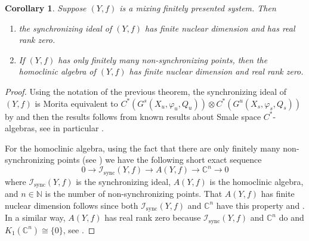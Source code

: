 \documentclass{amsart}
\newcommand{\C}{\mathbb{C}}
\newcommand{\N}{\mathbb{N}}
\theoremstyle{plain}
\newtheorem{corollary}[theorem]{Corollary}
\theoremstyle{definition}
\theoremstyle{remark}
\begin{document}
\begin{corollary}
Suppose $(Y, f)$ is a mixing finitely presented system. Then 
\begin{enumerate}
\item the synchronizing ideal of $(Y, f)$ has finite nuclear dimension and has real rank zero.
\item If $(Y, f)$ has only finitely many non-synchronizing points, then the homoclinic algebra of $(Y, f)$ has finite nuclear dimension and real rank zero.
\end{enumerate}
\end{corollary}
\begin{proof}
Using the notation of the previous theorem, the synchronizing ideal of $(Y, f)$ is Morita equivalent to $C^*(G^s(X_u, \varphi_u, Q_u)) \otimes C^*(G^u(X_s, \varphi_s, Q_s))$ by \cite[Theorem 6.10 part (i)]{DeeSto} and then the results follows from known results about Smale space $C^\ast$-algebras, see in particular \cite{MR4069199, MR3766855}.

For the homoclinic algebra, using the fact that there are only finitely many non-synchronizing points (see \cite[Theorem 6.11]{DeeSto}) we have the following short exact sequence
\[
0\rightarrow \mathcal{I}_\text{sync}(Y, f) \rightarrow A(Y,f) \rightarrow \C^n \rightarrow 0
\]
where $\mathcal{I}_\text{sync}(Y, f)$ is the synchronizing ideal, $A(Y,f)$ is the homoclinic algebra, and $n\in \N$ is the number of non-synchronizing points. That $A(Y,f)$ has finite nuclear dimension follows since both $\mathcal{I}_\text{sync}(Y, f)$ and $\C^n$ have this property and \cite[Proposition 2.9]{WinterZac:dimnuc}. In a similar way, $A(Y,f)$ has real rank zero because $\mathcal{I}_\text{sync}(Y, f)$ and $\C^n$ do and $K_1(\C^n) \cong \{ 0 \}$, see \cite{LinRor}.
\end{proof}
\end{document}
